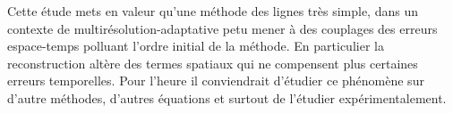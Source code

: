 Cette étude mets en valeur qu'une méthode des lignes très simple, dans un contexte de multirésolution-adaptative
petu mener à des couplages des erreurs espace-temps polluant l'ordre initial de la méthode.
En particulier la reconstruction altère des termes spatiaux qui ne compensent plus certaines erreurs temporelles. 
Pour l'heure il conviendrait d'étudier ce phénomène sur d'autre méthodes, d'autres équations et surtout de l'étudier expérimentalement.
